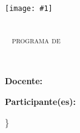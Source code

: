 \documentclass[11pt]{article}
\begin{document}
\newcommand{\modentitlepage}[1]\{
\begin{titlepage} 
    \noindent

    \noindent\begin{minipage}{0.2\textwidth}
        \texttt{[image: \#1]} 
    \end{minipage}%
    \hfill%
    \begin{minipage}{0.8\textwidth} %
        \scshape
        \textbf{\university } \vspace*{2mm} \\ 
        \facultad~ programa de \\ \program
    \end{minipage}


    \vspace*{3cm}
    \hfill
    \begin{minipage}{0.8\textwidth}
        \bfseries
        \Large
        \subject 
        \vspace*{1cm} \\

        \begin{minipage}{0.9\textwidth}
          \Huge
          \@title
        \end{minipage}

        \vspace*{4cm} 

        \Large
        \@date

        \vspace*{3cm}
        \hrulefill \par
        \vspace*{1cm}

        \large
        \mdseries	
        \textbf{Docente:} \\
        \docente

        \vspace*{1cm}

        \textbf{Participante(es):} \\ 
        \@author
    \end{minipage}
\end{titlepage}
\}
\end{document}
